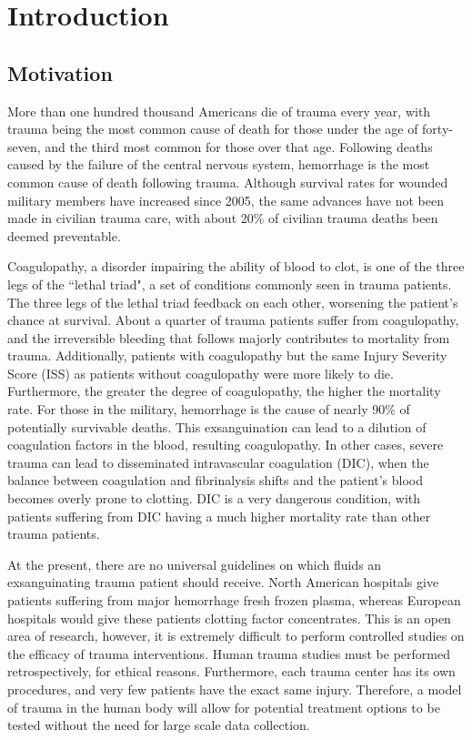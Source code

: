 \documentclass[12pt]{article}
\begin{document}
\section*{Introduction} 
\subsection*{Motivation} 
More than one hundred thousand Americans die of trauma every year, with trauma being the most common cause of death for those under the age of forty-seven, and the third most common for those over that age.\cite{rhee2014increasing} Following deaths caused by the failure of the central nervous system, hemorrhage is the most common cause of death following trauma.\cite{sauaia1995epidemiology,lansink2013cause} Although survival rates for wounded military members have increased since 2005, the same advances have not been made in civilian trauma care, with about 20\% of civilian trauma deaths been deemed preventable. \cite{percentdeaths}

Coagulopathy, a disorder impairing the ability of blood to clot, is one of the three legs of the ``lethal triad", a set of conditions commonly seen in trauma patients. The three legs of the lethal triad feedback on each other, worsening the patient's chance at survival. About a quarter of trauma patients suffer from coagulopathy, and the irreversible bleeding that follows majorly contributes to mortality from trauma. \cite{kauvar2006impact} 
Additionally, patients with coagulopathy but the same Injury Severity Score (ISS) as patients without coagulopathy were more likely to die. \cite{brohi2003acute} Furthermore, the greater the degree of coagulopathy, the higher the mortality rate. \cite{frith2010definition}
For those in the military, hemorrhage is the cause of nearly 90\% of potentially survivable deaths. \cite{blackbourne2010decreasing} This exsanguination can lead to a dilution of coagulation factors in the blood, resulting coagulopathy. In other cases, severe trauma can lead to disseminated intravascular coagulation (DIC), when the balance between coagulation and fibrinalysis shifts and the patient's blood becomes overly prone to clotting. \cite{boccaccio1981disseminated} DIC is a very dangerous condition, with patients suffering from DIC having a much higher mortality rate than other trauma patients. \cite{gando2001disseminated}

At the present, there are no universal guidelines on which fluids an exsanguinating trauma patient should receive. North American hospitals give patients suffering from major hemorrhage fresh frozen plasma, whereas European hospitals would give these patients clotting factor concentrates.\cite{hunt2014bleeding} This is an open area of research, however, it is extremely difficult to perform controlled studies on the efficacy of trauma interventions. Human trauma studies must be performed retrospectively, for ethical reasons. Furthermore, each trauma center has its own procedures, and very few patients have the exact same injury. Therefore, a model of trauma in the human body will allow for potential treatment options to be tested without the need for large scale data collection.
\end{document}
